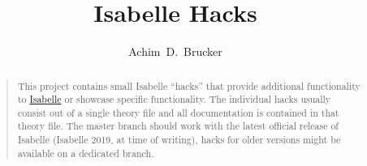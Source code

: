 \documentclass[10pt,DIV16,a4paper,abstract=true,twoside=semi,openright]
{scrreprt}
\title{Isabelle Hacks}
\author{Achim~D.~Brucker}%
\begin{document}
  \maketitle
  \begin{abstract}
    \begin{quote}
      This project contains small Isabelle ``hacks'' that provide additional
      functionality to \href{https://isabelle.in.tum.de}{Isabelle} or showcase
      specific functionality. The individual hacks usually consist out of 
      a single theory file and all documentation is contained in that 
      theory file. The master branch should work with the latest official 
      release of Isabelle (Isabelle 2019, at time of writing), hacks for 
      older versions might be available on a dedicated branch.

    \end{quote}
  \end{abstract}


\tableofcontents
\cleardoublepage


\end{document}
